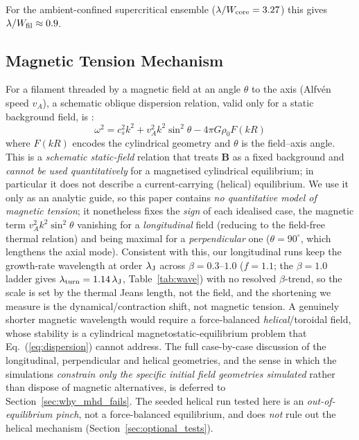 \documentclass[usenatbib,twoside,twocolumn]{mnras}
\begin{document}
For the ambient-confined supercritical ensemble ($\lambda/W_{\rm core}=3.27$) this gives $\lambda/W_{\rm fil}\approx0.9$.

\subsection{Magnetic Tension Mechanism}
\label{sec:magnetic}

For a filament threaded by a magnetic field at an angle $\theta$ to the axis (Alfv\'en speed $v_A$), a schematic oblique dispersion relation, valid only for a static background field, is \citep{Nakamura1993}:
\begin{equation}
\omega^2 = c_s^2 k^2 + v_A^2 k^2 \sin^2\theta - 4\pi G\rho_0 F(kR)
\label{eq:dispersion}
\end{equation}
where $F(kR)$ encodes the cylindrical geometry and $\theta$ is the field--axis angle. This is a \emph{schematic static-field} relation that treats $\mathbf{B}$ as a fixed background and \emph{cannot be used quantitatively} for a magnetised cylindrical equilibrium; in particular it does not describe a current-carrying (helical) equilibrium. We use it only as an analytic guide, so this paper contains \emph{no quantitative model of magnetic tension}; it nonetheless fixes the \emph{sign} of each idealised case, the magnetic term $v_A^2k^2\sin^2\theta$ vanishing for a \emph{longitudinal} field (reducing to the field-free thermal relation) and being maximal for a \emph{perpendicular} one ($\theta=90^\circ$, which lengthens the axial mode). Consistent with this, our longitudinal runs keep the growth-rate wavelength at order $\lambda_{\rm J}$ across $\beta=0.3$--$1.0$ ($f=1.1$; the $\beta=1.0$ ladder gives $\lambda_{\rm turn}=1.14\,\lambda_{\rm J}$, Table~\ref{tab:wave}) with no resolved $\beta$-trend, so the scale is set by the thermal Jeans length, not the field, and the shortening we measure is the dynamical/contraction shift, not magnetic tension. A genuinely shorter magnetic wavelength would require a force-balanced \emph{helical}/toroidal field, whose stability is a cylindrical magnetostatic-equilibrium problem that Eq.~(\ref{eq:dispersion}) cannot address. The full case-by-case discussion of the longitudinal, perpendicular and helical geometries, and the sense in which the simulations \emph{constrain only the specific initial field geometries simulated} rather than dispose of magnetic alternatives, is deferred to Section~\ref{sec:why_mhd_fails}. The seeded helical run tested here is an \emph{out-of-equilibrium pinch}, not a force-balanced equilibrium, and does \emph{not} rule out the helical mechanism (Section~\ref{sec:optional_tests}).
\end{document}
